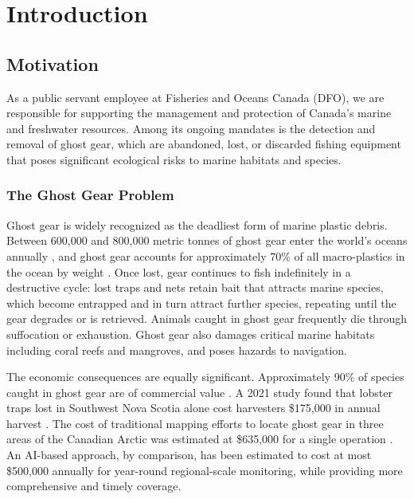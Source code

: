 \documentclass[12pt, letterpaper]{article}
\begin{document}
\newpage

\tableofcontents
\newpage

\section{Introduction}

\subsection{Motivation}

As a public servant employee at Fisheries and Oceans Canada (DFO), we are responsible for supporting the management and protection of Canada's marine and freshwater resources. Among its ongoing mandates is the detection and removal of ghost gear, which are abandoned, lost, or discarded fishing equipment that poses significant ecological risks to marine habitats and species.

\subsubsection*{The Ghost Gear Problem}

Ghost gear is widely recognized as the deadliest form of marine plastic debris.
Between 600,000 and 800,000 metric tonnes of ghost gear enter the world's oceans
annually \cite{canadiangeographic2021}, and ghost gear accounts for approximately 70\% of all macro-plastics in the ocean by weight \cite{ifaw2022}. Once lost, gear continues to fish indefinitely in a destructive cycle: lost traps and nets retain bait that attracts marine species, which become entrapped and in turn attract further species, repeating until the gear degrades or is retrieved. Animals caught in ghost gear frequently die through suffocation or exhaustion. Ghost gear also damages critical marine habitats including coral reefs and mangroves, and poses hazards to navigation.

The economic consequences are equally significant. Approximately 90\% of species
caught in ghost gear are of commercial value \cite{ifaw2022}. A 2021 study found
that lobster traps lost in Southwest Nova Scotia alone cost harvesters \$175,000 in annual harvest \cite{canadiangeographic2021}. The cost of traditional mapping efforts to locate ghost gear in three areas of the Canadian Arctic was estimated at \$635,000 for a single operation \cite{dfopsdc2023}. An AI-based approach, by comparison, has been estimated to cost at most \$500,000 annually for year-round regional-scale monitoring, while providing more comprehensive and timely coverage.
\end{document}
